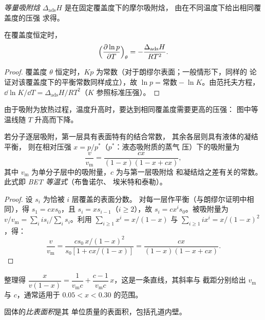 \begin{definition}[等量吸附焓]\label{def:b3:surfaces-catalysis:isosteric}
\emph{等量吸附焓}
$\Delta_{\mathrm{ads}}H$ 是在固定覆盖度下的摩尔吸附焓，
由在不同温度下给出相同覆盖度的压强
求得。
\end{definition}

\begin{proposition}[等量吸附焓]\label{prop:b3:surfaces-catalysis:isosteric}
在覆盖度恒定时，
\[
  \Bigl(\frac{\partial\ln p}{\partial T}\Bigr)_\theta = -\frac{\Delta_{\mathrm{ads}}H}{RT^2} .
\]
\end{proposition}

\begin{proof}
覆盖度 $\theta$ 恒定时，$Kp$ 为常数（对于朗缪尔表面；一般情形下，同样的
论证对该覆盖度下的平衡常数同样成立），故 $\ln p =
\text{常数} - \ln K$。由范托夫方程，$\dd\ln K/\dd T = \Delta_{\mathrm{ads}}H/RT^2$（$K$
参照标准压强）。
\end{proof}

由于吸附为放热过程，温度升高时，要达到相同覆盖度需要更高的压强：
图中等温线随 $T$ 升高而下降。

\begin{theorem}\label{thm:b3:surfaces-catalysis:bet}
若分子逐层吸附，第一层具有表面特有的结合常数，
其余各层则具有液体的凝结平衡，
则在相对压强 $x = p/p^*$（$p^*$：液态吸附质的蒸气
压）下的吸附量为
\[
  \frac{v}{v_{\mathrm m}} = \frac{cx}{(1 - x)(1 - x + cx)},
\]
其中 $v_{\mathrm m}$ 为单分子层中的吸附量，$c$ 为与第一层吸附焓
和凝结焓之差有关的常数。此式即
\emph{BET 等温式}（布鲁诺尔、
埃米特和泰勒）。
\end{theorem}

\begin{proof}
设 $s_i$ 为恰被 $i$ 层覆盖的表面分数。
对每一层作平衡（与朗缪尔证明中相同），得 $s_1 = cxs_0$，且 $s_i =
xs_{i-1}$（$i \ge 2$），故 $s_i = cx^is_0$。被吸附量为 $v/v_{\mathrm m} =
\sum_iis_i/\sum_is_i$。利用 $\sum_{i\ge1}x^i = x/(1 - x)$ 与 $\sum_{i\ge1}ix^i = x/(1 - x)^2$，得：
\[
  \frac{v}{v_{\mathrm m}} = \frac{cs_0\,x/(1 - x)^2}{s_0[1 + cx/(1 - x)]} = \frac{cx}{(1 - x)(1 - x + cx)} .
\]
\end{proof}

整理得 $\dfrac{x}{v(1 - x)} = \dfrac{1}{v_{\mathrm m}c} + \dfrac{c - 1}{v_{\mathrm m}c}\,x$，这是一条直线，其斜率与
截距分别给出 $v_{\mathrm m}$ 与 $c$，通常适用于 $0.05 < x < 0.30$ 的范围。

\begin{definition}[比表面积]\label{def:b3:surfaces-catalysis:surface-area}
固体的\emph{比表面积}是其
单位质量的表面积，包括孔道内壁。
\end{definition}


